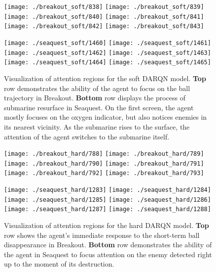 \documentclass{article} \usepackage{nips15submit_e,times}
\begin{document}
\begin{figure}
	\centering
	\texttt{[image: ./breakout\_soft/838]}
	\texttt{[image: ./breakout\_soft/839]}
	\texttt{[image: ./breakout\_soft/840]}
	\texttt{[image: ./breakout\_soft/841]}
	\texttt{[image: ./breakout\_soft/842]}
	\texttt{[image: ./breakout\_soft/843]}
	
	\texttt{[image: ./seaquest\_soft/1460]}
	\texttt{[image: ./seaquest\_soft/1461]}
	\texttt{[image: ./seaquest\_soft/1462]}
	\texttt{[image: ./seaquest\_soft/1463]}
	\texttt{[image: ./seaquest\_soft/1464]}
	\texttt{[image: ./seaquest\_soft/1465]}
	\caption{Visualization of attention regions for the soft DARQN model. \textbf{Top} row demonstrates the ability of the agent to focus on the ball trajectory in Breakout. \textbf{Bottom} row displays the process of submarine resurface in Seaquest. On the first screen, the agent mostly focuses on the oxygen indicator, but also notices enemies in its nearest vicinity. As the submarine rises to the surface, the attention of the agent switches to the submarine itself.}
	\label{fig:softframes}
\end{figure}
\begin{figure}
	\centering
	\texttt{[image: ./breakout\_hard/788]}
	\texttt{[image: ./breakout\_hard/789]}
	\texttt{[image: ./breakout\_hard/790]}
	\texttt{[image: ./breakout\_hard/791]}
	\texttt{[image: ./breakout\_hard/792]}
	\texttt{[image: ./breakout\_hard/793]}
	
	\texttt{[image: ./seaquest\_hard/1283]}
	\texttt{[image: ./seaquest\_hard/1284]}
	\texttt{[image: ./seaquest\_hard/1285]}
	\texttt{[image: ./seaquest\_hard/1286]}
	\texttt{[image: ./seaquest\_hard/1287]}
	\texttt{[image: ./seaquest\_hard/1288]}
	\caption{Visualization of attention regions for the hard DARQN model. \textbf{Top} row shows the agent's immediate response to the short-term ball disappearance in Breakout. \textbf{Bottom} row demonstrates the ability of the agent in Seaquest to focus attention on the enemy detected right up to the moment of its destruction.}
	\label{fig:hardframes}
\end{figure}
\end{document}
